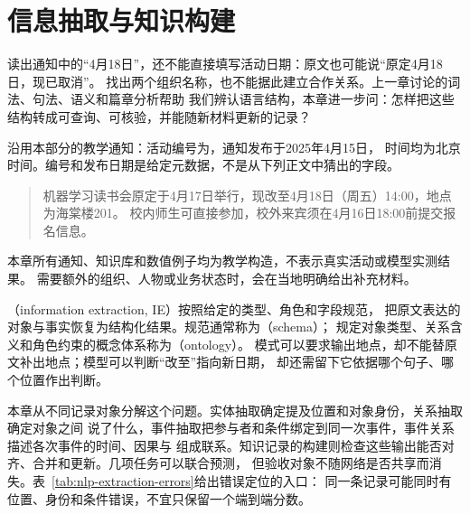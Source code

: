 \chapter{信息抽取与知识构建}
\label{chap:nlp-information-extraction}

读出通知中的“4月18日”，还不能直接填写活动日期：原文也可能说“原定4月18日，现已取消”。
找出两个组织名称，也不能据此建立合作关系。上一章讨论的词法、句法、语义和篇章分析帮助
我们辨认语言结构，本章进一步问：怎样把这些结构转成可查询、可核验，并能随新材料更新的记录？

沿用本部分的教学通知：活动编号为，通知发布于2025年4月15日，
时间均为北京时间。编号和发布日期是给定元数据，不是从下列正文中猜出的字段。
\begin{quote}
机器学习读书会原定于4月17日举行，现改至4月18日（周五）14:00，地点为海棠楼201。
校内师生可直接参加，校外来宾须在4月16日18:00前提交报名信息。
\end{quote}
本章所有通知、知识库和数值例子均为教学构造，不表示真实活动或模型实测结果。
需要额外的组织、人物或业务状态时，会在当地明确给出补充材料。

（information extraction, IE）按照给定的类型、角色和字段规范，
把原文表达的对象与事实恢复为结构化结果。规范通常称为（schema）；
规定对象类型、关系含义和角色约束的概念体系称为（ontology）。
模式可以要求输出地点，却不能替原文补出地点；模型可以判断“改至”指向新日期，
却还需留下它依据哪个句子、哪个位置作出判断。

本章从不同记录对象分解这个问题。实体抽取确定提及位置和对象身份，关系抽取确定对象之间
说了什么，事件抽取把参与者和条件绑定到同一次事件，事件关系描述各次事件的时间、因果与
组成联系。知识记录的构建则检查这些输出能否对齐、合并和更新。几项任务可以联合预测，
但验收对象不随网络是否共享而消失。表~\ref{tab:nlp-extraction-errors}给出错误定位的入口：
同一条记录可能同时有位置、身份和条件错误，不宜只保留一个端到端分数。

